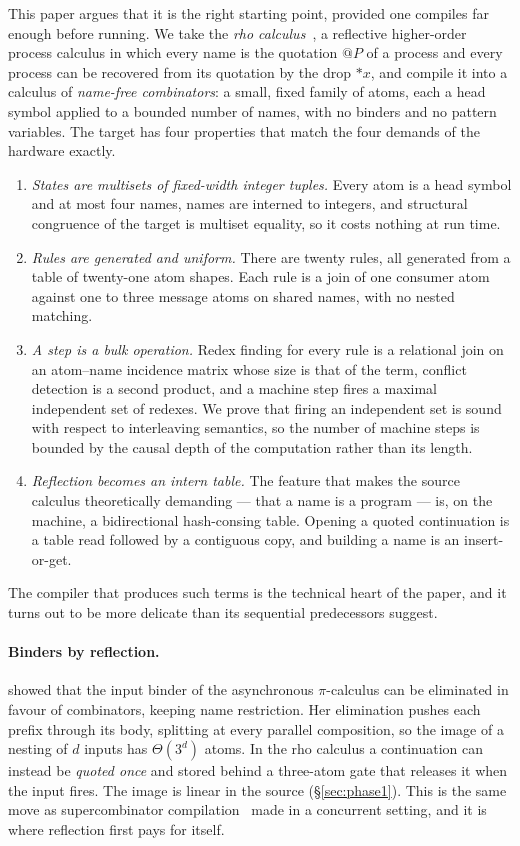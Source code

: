 \documentclass[acmsmall,screen,review,anonymous]{acmart}
\makeatletter
\newcommand{\quo}[1]{@#1}
\newcommand{\drp}[1]{{*}#1}
\makeatother
\begin{document}
This paper argues that it is the right starting point, provided one compiles
far enough before running. We take the \emph{rho calculus}~\cite{MeredithRadestock05},
a reflective higher-order process calculus in which every name is the
quotation $\quo{P}$ of a process and every process can be recovered from its
quotation by the drop $\drp{x}$, and compile it into a calculus of
\emph{name-free combinators}: a small, fixed family of atoms, each a head
symbol applied to a bounded number of names, with no binders and no pattern
variables. The target has four properties that match the four demands of
the hardware exactly.
\begin{enumerate}[leftmargin=2em]
\item \emph{States are multisets of fixed-width integer tuples.} Every atom is
  a head symbol and at most four names, names are interned to integers, and
  structural congruence of the target is multiset equality, so it costs
  nothing at run time.
\item \emph{Rules are generated and uniform.} There are twenty rules, all
  generated from a table of twenty-one atom shapes. Each rule is a join of
  one consumer atom against one to three message atoms on shared names, with
  no nested matching.
\item \emph{A step is a bulk operation.} Redex finding for every rule is a
  relational join on an atom--name incidence matrix whose size is that of
  the term, conflict detection is a second product, and a machine step fires
  a maximal independent set of redexes. We prove that firing an independent
  set is sound with respect to interleaving semantics, so the number of
  machine steps is bounded by the causal depth of the computation rather
  than its length.
\item \emph{Reflection becomes an intern table.} The feature that makes the
  source calculus theoretically demanding --- that a name is a program --- is,
  on the machine, a bidirectional hash-consing table. Opening a quoted
  continuation is a table read followed by a contiguous copy, and building a
  name is an insert-or-get.
\end{enumerate}

The compiler that produces such terms is the technical heart of the paper,
and it turns out to be more delicate than its sequential predecessors suggest.

\paragraph{Binders by reflection.}
\citet{Yoshida02} showed that the input binder of the asynchronous
$\pi$-calculus can be eliminated in favour of combinators, keeping
name restriction. Her elimination pushes each prefix through its body,
splitting at every parallel composition, so the image of a nesting of $d$
inputs has $\Theta(3^{d})$ atoms. In the rho calculus a continuation can
instead be \emph{quoted once} and stored behind a three-atom gate that
releases it when the input fires. The image is linear in the source
(\S\ref{sec:phase1}). This is the same move as supercombinator
compilation~\cite{Hughes82} made in a concurrent setting, and it is where
reflection first pays for itself.
\end{document}
